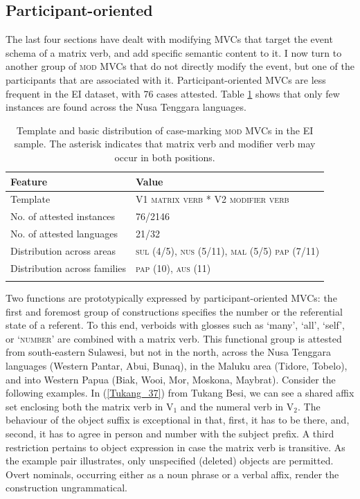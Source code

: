 \subsection{Participant-oriented}

The last four sections have dealt with modifying MVCs that target the event schema of a matrix verb, and add specific semantic content to it. I now turn to another group of \textsc{mod} MVCs that do not directly modify the event, but one of the participants that are associated with it. Participant-oriented MVCs are less frequent in the EI dataset, with 76 cases attested. Table \ref{table:participant} shows that only few instances are found across the Nusa Tenggara languages.

\begin{table}
\begin{tabular}{ll}
\lsptoprule
Feature&Value\tabularnewline
\hline
Template&V1 \textsc{matrix verb} * V2 \textsc{modifier verb}\tabularnewline
No. of attested instances& 76/2146 \tabularnewline
No. of attested languages& 21/32 \tabularnewline
Distribution across areas& \textsc{sul} (4/5), \textsc{nus} (5/11), \textsc{mal} (5/5) \textsc{pap} (7/11) \tabularnewline
Distribution across families& \textsc{pap} (10), \textsc{aus} (11) \tabularnewline
\lspbottomrule
\end{tabular}
\caption[Template and basic distribution of case-marking \textsc{mod} MVCs]{Template and basic distribution of case-marking \textsc{mod} MVCs in the EI sample. The asterisk indicates that matrix verb and modifier verb may occur in both positions.}
\label{table:participant}
\end{table}

Two functions are prototypically expressed by participant-oriented MVCs: the first and foremost group of constructions specifies the number or the referential state of a referent. To this end, verboids with glosses such as `many', `all', `self', or `\textsc{number}' are combined with a matrix verb. This functional group is attested from south-eastern Sulawesi, but not in the north, across the Nusa Tenggara languages (Western Pantar, Abui, Bunaq), in the Maluku area (Tidore, Tobelo), and into Western Papua (Biak, Wooi, Mor, Moskona, Maybrat). Consider the following examples. In (\ref{Tukang_37}) from Tukang Besi, we can see a shared affix set enclosing both the matrix verb in V$_1$ and the numeral verb in V$_2$. The behaviour of the object suffix is exceptional in that, first, it has to be there, and, second, it has to agree in person and number with the subject prefix. A third restriction pertains to object expression in case the matrix verb is transitive. As the example pair illustrates, only unspecified (deleted) objects are permitted. Overt nominals, occurring either as a noun phrase or a verbal affix, render the construction ungrammatical.

